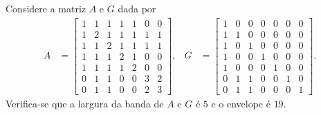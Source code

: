 \begin{exem}
    Considere a matriz $A$ e $G$ dada por
    \begin{align*}
        A &= \begin{bmatrix}
            1 & 1 & 1 & 1 & 1 & 0 & 0 \\
            1 & 2 & 1 & 1 & 1 & 1 & 1 \\
            1 & 1 & 2 & 1 & 1 & 1 & 1 \\
            1 & 1 & 1 & 2 & 1 & 0 & 0 \\
            1 & 1 & 1 & 1 & 2 & 0 & 0 \\
            0 & 1 & 1 & 0 & 0 & 3 & 2 \\
            0 & 1 & 1 & 0 & 0 & 2 & 3
        \end{bmatrix},
        & G &= \begin{bmatrix}
            1 & 0 & 0 & 0 & 0 & 0 & 0 \\
            1 & 1 & 0 & 0 & 0 & 0 & 0 \\
            1 & 0 & 1 & 0 & 0 & 0 & 0 \\
            1 & 0 & 0 & 1 & 0 & 0 & 0 \\
            1 & 0 & 0 & 0 & 1 & 0 & 0 \\
            0 & 1 & 1 & 0 & 0 & 1 & 0 \\
            0 & 1 & 1 & 0 & 0 & 0 & 1
        \end{bmatrix}.
    \end{align*}
    Verifica-se que a largura da banda de $A$ e $G$ é $5$ e o envelope é $19$.


\end{exem}
